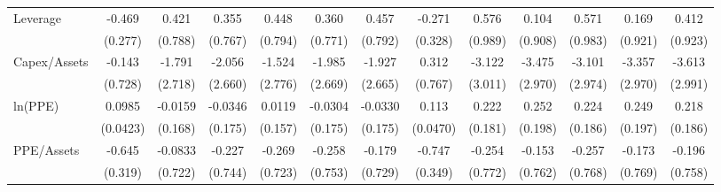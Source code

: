 {\begin{tabular}{l*{12}{c}}
Leverage            &      -0.469\sym{*}  &       0.421         &       0.355         &       0.448         &       0.360         &       0.457         &      -0.271         &       0.576         &       0.104         &       0.571         &       0.169         &       0.412         \\
                    &     (0.277)         &     (0.788)         &     (0.767)         &     (0.794)         &     (0.771)         &     (0.792)         &     (0.328)         &     (0.989)         &     (0.908)         &     (0.983)         &     (0.921)         &     (0.923)         \\
Capex/Assets        &      -0.143         &      -1.791         &      -2.056         &      -1.524         &      -1.985         &      -1.927         &       0.312         &      -3.122         &      -3.475         &      -3.101         &      -3.357         &      -3.613         \\
                    &     (0.728)         &     (2.718)         &     (2.660)         &     (2.776)         &     (2.669)         &     (2.665)         &     (0.767)         &     (3.011)         &     (2.970)         &     (2.974)         &     (2.970)         &     (2.991)         \\
ln(PPE)             &      0.0985\sym{**} &     -0.0159         &     -0.0346         &      0.0119         &     -0.0304         &     -0.0330         &       0.113\sym{**} &       0.222         &       0.252         &       0.224         &       0.249         &       0.218         \\
                    &    (0.0423)         &     (0.168)         &     (0.175)         &     (0.157)         &     (0.175)         &     (0.175)         &    (0.0470)         &     (0.181)         &     (0.198)         &     (0.186)         &     (0.197)         &     (0.186)         \\
PPE/Assets          &      -0.645\sym{**} &     -0.0833         &      -0.227         &      -0.269         &      -0.258         &      -0.179         &      -0.747\sym{**} &      -0.254         &      -0.153         &      -0.257         &      -0.173         &      -0.196         \\
                    &     (0.319)         &     (0.722)         &     (0.744)         &     (0.723)         &     (0.753)         &     (0.729)         &     (0.349)         &     (0.772)         &     (0.762)         &     (0.768)         &     (0.769)         &     (0.758)         \\

\end{tabular}}
